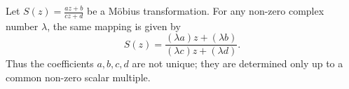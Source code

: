 Let $S(z) = \frac{az+b}{cz+d}$ be a Möbius transformation. For any non-zero complex number $\lambda$, the same mapping is given by
$$S(z) = \frac{(\lambda a)z + (\lambda b)}{(\lambda c)z + (\lambda d)}.$$
Thus the coefficients $a, b, c, d$ are not unique; they are determined only up to a common non-zero scalar multiple.
